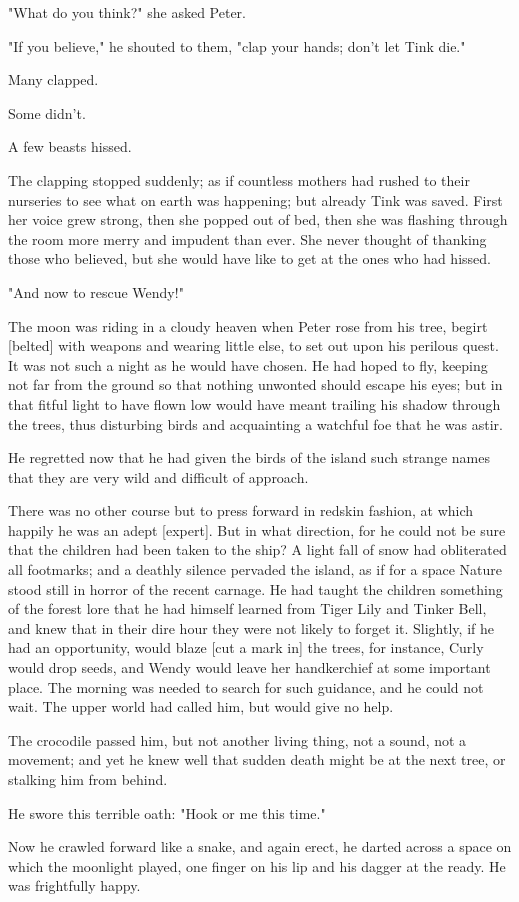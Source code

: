 "What do you think?" she asked Peter.


"If you believe," he shouted to them, "clap your hands; don't let Tink
die."


Many clapped.


Some didn't.


A few beasts hissed.


The clapping stopped suddenly; as if countless mothers had rushed to their
nurseries to see what on earth was happening; but already Tink was saved.
First her voice grew strong, then she popped out of bed, then she was
flashing through the room more merry and impudent than ever. She never
thought of thanking those who believed, but she would have like to get at
the ones who had hissed.


"And now to rescue Wendy!"


The moon was riding in a cloudy heaven when Peter rose from his tree,
begirt [belted] with weapons and wearing little else, to set out upon his
perilous quest. It was not such a night as he would have chosen. He had
hoped to fly, keeping not far from the ground so that nothing unwonted
should escape his eyes; but in that fitful light to have flown low would
have meant trailing his shadow through the trees, thus disturbing birds
and acquainting a watchful foe that he was astir.


He regretted now that he had given the birds of the island such strange
names that they are very wild and difficult of approach.


There was no other course but to press forward in redskin fashion, at
which happily he was an adept [expert]. But in what direction, for he
could not be sure that the children had been taken to the ship? A light
fall of snow had obliterated all footmarks; and a deathly silence pervaded
the island, as if for a space Nature stood still in horror of the recent
carnage. He had taught the children something of the forest lore that he
had himself learned from Tiger Lily and Tinker Bell, and knew that in
their dire hour they were not likely to forget it. Slightly, if he had an
opportunity, would blaze [cut a mark in] the trees, for instance, Curly
would drop seeds, and Wendy would leave her handkerchief at some important
place. The morning was needed to search for such guidance, and he could
not wait. The upper world had called him, but would give no help.


The crocodile passed him, but not another living thing, not a sound, not a
movement; and yet he knew well that sudden death might be at the next
tree, or stalking him from behind.


He swore this terrible oath: "Hook or me this time."


Now he crawled forward like a snake, and again erect, he darted across a
space on which the moonlight played, one finger on his lip and his dagger
at the ready. He was frightfully happy.

